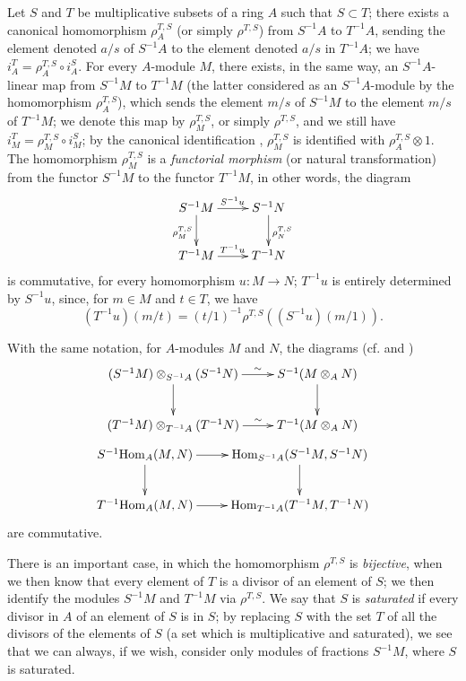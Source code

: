 \begin{env}[1.4.1]
\label{0.1.4.1}
Let $S$ and $T$ be multiplicative subsets of a ring $A$ such that $S\subset T$;
there exists a canonical homomorphism $\rho_A^{T,S}$ (or simply $\rho^{T,S}$)
from $S^{-1}A$ to $T^{-1}A$, sending the element denoted $a/s$ of $S^{-1}A$ to
the element denoted $a/s$ in $T^{-1}A$; we have $i_A^T=\rho_A^{T,S}\circ i_A^S$.
For every $A$-module $M$, there exists, in the same way, an $S^{-1}A$-linear map
from $S^{-1}M$ to $T^{-1}M$ (the latter considered as an $S^{-1}A$-module by
the homomorphism $\rho_A^{T,S}$), which sends the element $m/s$ of $S^{-1}M$
to the element $m/s$ of $T^{-1}M$; we denote this map by $\rho_M^{T,S}$, or
simply $\rho^{T,S}$, and we still have $i_M^T=\rho_M^{T,S}\circ i_M^S$; by the
canonical identification , $\rho_M^{T,S}$ is identified with
$\rho_A^{T,S}\otimes 1$. The homomorphism $\rho_M^{T,S}$ is a \emph{functorial
morphism} (or natural transformation) from the functor $S^{-1}M$ to the functor
$T^{-1}M$, in other words, the diagram
\[
  \xymatrix{
    S^{-1}M\ar[r]^{S^{-1}u}\ar[d]_{\rho_M^{T,S}} &
    S^{-1}N\ar[d]^{\rho_N^{T,S}}\\
    T^{-1}M\ar[r]^{T^{-1}u} &
    T^{-1}N
  }
\]
is
commutative, for every homomorphism $u:M\to N$; $T^{-1}u$ is entirely
determined by $S^{-1}u$, since, for $m\in M$ and $t\in T$, we have
\[
  (T^{-1}u)(m/t)=(t/1)^{-1}\rho^{T,S}((S^{-1}u)(m/1)).
\]
\end{env}

\begin{env}[1.4.2]
\label{0.1.4.2}
With the same notation, for $A$-modules $M$ and $N$, the diagrams (cf.  and )
\[
  \xymatrix{
    (S^{-1}M)\otimes_{S^{-1}A}(S^{-1}N)\ar[r]^-\sim\ar[d] &
    S^{-1}(M\otimes_A N)\ar[d]\\
    (T^{-1}M)\otimes_{T^{-1}A}(T^{-1}N)\ar[r]^-\sim &
    T^{-1}(M\otimes_A N)
  }
\]
\[
  \xymatrix{
    S^{-1}\Hom_A(M,N)\ar[r]\ar[d] &
    \Hom_{S^{-1}A}(S^{-1}M,S^{-1}N)\ar[d]\\
    T^{-1}\Hom_A(M,N)\ar[r] &
    \Hom_{T^{-1}A}(T^{-1}M,T^{-1}N)
  }
\]
are commutative.
\end{env}

\begin{env}[1.4.3]
\label{0.1.4.3}
There is an important case, in which the homomorphism $\rho^{T,S}$ is
\emph{bijective}, when we then know that every element of $T$ is a divisor of an
element of $S$; we then identify the modules $S^{-1}M$ and $T^{-1}M$ via
$\rho^{T,S}$. We say that $S$ is \emph{saturated} if every divisor in $A$ of an
element of $S$ is in $S$; by replacing $S$ with the set $T$ of all the divisors
of the elements of $S$ (a set which is multiplicative and saturated), we see
that we can always, if we wish, consider only modules of
fractions $S^{-1}M$, where $S$ is saturated.
\end{env}


